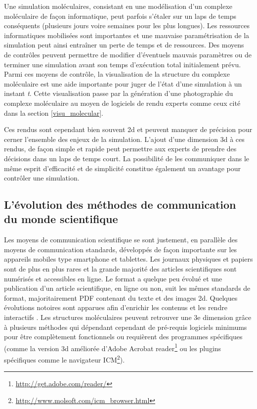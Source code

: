 Une simulation moléculaires, consistant en une modélisation d'un complexe moléculaire de façon informatique, peut parfois s'étaler sur un laps de temps conséquents (plusieurs jours voire semaines pour les plus longues). Les ressources informatiques mobilisées sont importantes et une mauvaise paramétrisation de la simulation peut ainsi entraîner un perte de temps et de ressources. Des moyens de contrôles peuvent permettre de modifier d'éventuels mauvais paramètres ou de terminer une simulation avant son temps d'exécution total initialement prévu. Parmi ces moyens de contrôle, la visualisation de la structure du complexe moléculaire est une aide importante pour juger de l'état d'une simulation à un instant \textit{t}.
Cette visualisation passe par la génération d'une photographie du complexe moléculaire au moyen de logiciels de rendu experts comme ceux cité dans la section \ref{visu_molecular}.

Ces rendus sont cependant bien souvent 2d et peuvent manquer de précision pour cerner l'ensemble des enjeux de la simulation. L'ajout d'une dimension 3d à ces rendus, de façon simple et rapide peut permettre aux experts de prendre des décisions dans un laps de temps court. La possibilité de les communiquer dans le même esprit d'efficacité et de simplicité constitue également un avantage pour contrôler une simulation.

\subsection{L'évolution des méthodes de communication du monde scientifique}

Les moyens de communication scientifique se sont justement, en parallèle des moyens de communication standards, développés de façon importante sur les appareils mobiles type smartphone et tablettes. Les journaux physiques et papiers sont de plus en plus rares et la grande majorité des articles scientifiques sont numérisés et accessibles en ligne. Le format a quelque peu évolué et une publication d'un article scientifique, en ligne ou non, suit les mêmes standards de format, majoritairement PDF contenant du texte et des images 2d. Quelques évolutions notoires sont apparues afin d'enrichir les contenus et les rendre interactifs \cite{attwood2010utopia}. Les structures moléculaires peuvent retrouver une 3e dimension grâce à plusieurs méthodes \cite{kumar2008grasping,raush2009new} qui dépendant cependant de pré-requis logiciels minimums pour être complètement fonctionnels ou requièrent des programmes spécifiques (comme la version 3d améliorée d'Adobe Acrobat reader\footnote{\url{http://get.adobe.com/reader/}} ou les plugins spécifiques comme le navigateur ICM\footnote{\url{http://www.molsoft.com/icm_browser.html}}).

